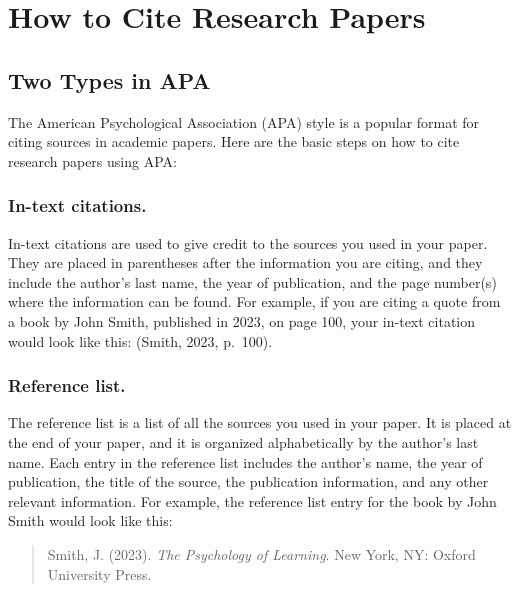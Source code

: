 \documentclass[
  b5paper]{book}
\begin{document}
\hypertarget{cite}{%
\section{How to Cite Research Papers}\label{cite}}

\hypertarget{two-types-in-apa}{%
\subsection*{Two Types in APA}\label{two-types-in-apa}}

The American Psychological Association (APA) style is a popular format for citing sources in academic papers. Here are the basic steps on how to cite research papers using APA:

\hypertarget{in-text-citations.}{%
\subsubsection*{In-text citations.}\label{in-text-citations.}}

In-text citations are used to give credit to the sources you used in your paper. They are placed in parentheses after the information you are citing, and they include the author's last name, the year of publication, and the page number(s) where the information can be found. For example, if you are citing a quote from a book by John Smith, published in 2023, on page 100, your in-text citation would look like this: (Smith, 2023, p.~100).

\hypertarget{reference-list.}{%
\subsubsection*{Reference list.}\label{reference-list.}}

The reference list is a list of all the sources you used in your paper. It is placed at the end of your paper, and it is organized alphabetically by the author's last name. Each entry in the reference list includes the author's name, the year of publication, the title of the source, the publication information, and any other relevant information. For example, the reference list entry for the book by John Smith would look like this:

\begin{quote}
Smith, J. (2023). \emph{The Psychology of Learning}. New York, NY: Oxford University Press.
\end{quote}
\end{document}
